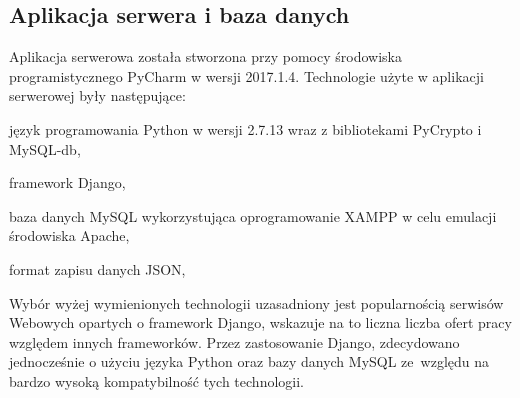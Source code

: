 \newpage
\subsection{Aplikacja serwera i baza danych}
Aplikacja serwerowa została stworzona przy pomocy środowiska programistycznego PyCharm w wersji 2017.1.4. Technologie użyte w aplikacji serwerowej były następujące:
\begin{itemize*}
	\item język programowania Python w wersji 2.7.13 wraz z bibliotekami \linebreak PyCrypto i MySQL-db,
	\item framework Django,
	\item baza danych MySQL wykorzystująca oprogramowanie XAMPP w celu emulacji środowiska Apache,
	\item format zapisu danych JSON,
\end{itemize*}

Wybór wyżej wymienionych technologii uzasadniony jest popularnością serwisów Webowych opartych o framework Django, wskazuje na to liczna liczba ofert pracy względem innych frameworków. Przez zastosowanie Django, zdecydowano jednocześnie o użyciu języka Python oraz bazy danych MySQL ze~względu na bardzo wysoką kompatybilność tych technologii. 

